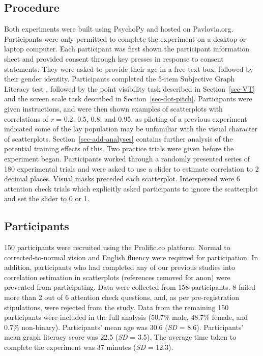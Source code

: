\documentclass[manuscript, review, anonymous, screen]{acmart}
\begin{document}
\hypertarget{sec-gen-procedure}{%
\subsection{Procedure}\label{sec-gen-procedure}}

Both experiments were built using PsychoPy \citep{pierce_2019} and
hosted on Pavlovia.org. Participants were only permitted to complete the
experiment on a desktop or laptop computer. Each participant was first
shown the participant information sheet and provided consent through key
presses in response to consent statements. They were asked to provide
their age in a free text box, followed by their gender identity.
Participants completed the 5-item Subjective Graph Literacy test
\citep{garcia_2016}, followed by the point visibility task described in
Section~\ref{sec-VT} and the screen scale task described in
Section~\ref{sec-dot-pitch}. Participants were given instructions, and
were then shown examples of scatterplots with correlations of \emph{r} =
0.2, 0.5, 0.8, and 0.95, as piloting of a previous experiment indicated
some of the lay population may be unfamiliar with the visual character
of scatterplots. Section~\ref{sec-add-analyses} contains further
analysis of the potential training effects of this. Two practice trials
were given before the experiment began. Participants worked through a
randomly presented series of 180 experimental trials and were asked to
use a slider to estimate correlation to 2 decimal places. Visual masks
preceded each scatterplot. Interspersed were 6 attention check trials
which explicitly asked participants to ignore the scatterplot and set
the slider to 0 or 1.

\hypertarget{sec-participants}{%
\subsection{Participants}\label{sec-participants}}

150 participants were recruited using the Prolific.co platform. Normal
to corrected-to-normal vision and English fluency were required for
participation. In addition, participants who had completed any of our
previous studies into correlation estimation in scatterplots (references
removed for anon) were prevented from participating. Data were collected
from 158 participants. 8 failed more than 2 out of 6 attention check
questions, and, as per pre-registration stipulations, were rejected from
the study. Data from the remaining 150 participants were included in the
full analysis (50.7\% male, 48.7\% female, and 0.7\% non-binary).
Participants' mean age was 30.6 (\emph{SD} = 8.6). Participants' mean
graph literacy score was 22.5 (\emph{SD} = 3.5). The average time taken
to complete the experiment was 37 minutes (\emph{SD} = 12.3).
\end{document}
